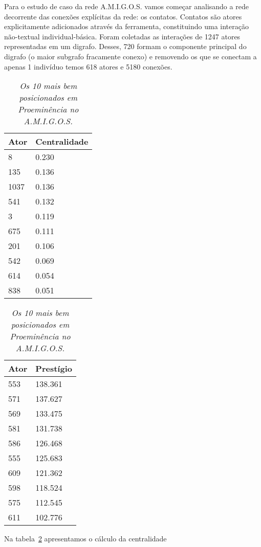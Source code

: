 \documentclass{article}
\begin{document}
\begin{table}[htbp]
	\begin{boxedminipage}{\textwidth}
Para o estudo de caso da rede A.M.I.G.O.S. vamos começar analisando a rede
decorrente das conexões explícitas da rede: os contatos. Contatos são atores
explicitamente adicionados através da ferramenta, constituindo uma interação
não-textual individual-básica. Foram coletadas as interações de 1247 atores
representadas em um digrafo. Desses, 720 formam o componente principal do
digrafo (o maior subgrafo fracamente conexo) e removendo os que se conectam a
apenas 1 indivíduo temos 618 atores e 5180 conexões.
		\large       %
		\setlength{\arrayrulewidth}{2\arrayrulewidth}  %
		\setlength{\belowcaptionskip}{10pt}  %
		\caption{\it Os 10 mais bem posicionados em Proeminência no A.M.I.G.O.S.}
		\centering   %
		\begin{tabular}{| l | l |}
			\hline
			Ator & Centralidade \\ \hline
			8 & 0.230 \\
			135 & 0.136 \\
			1037 & 0.136 \\
			541 & 0.132 \\
			3 & 0.119 \\
			675 & 0.111 \\
			201 & 0.106 \\
			542 & 0.069 \\
			614 & 0.054 \\
			838 & 0.051\\
			\hline
		\end{tabular}
		\begin{tabular}{| l | l |}
			\hline
			Ator & Prestígio \\ \hline
			553 & 138.361 \\
			571 & 137.627 \\
			569 & 133.475 \\
			581 & 131.738 \\
			586 & 126.468 \\
			555 & 125.683 \\
			609 & 121.362 \\
			598 & 118.524 \\
			575 & 112.545 \\
			611 & 102.776 \\
			\hline
		\end{tabular}
		\label{tab:acontccent}
\flushleft
Na tabela~\ref{tab:acontccent} apresentamos o cálculo da centralidade

\end{boxedminipage}
\end{table}
\end{document}
